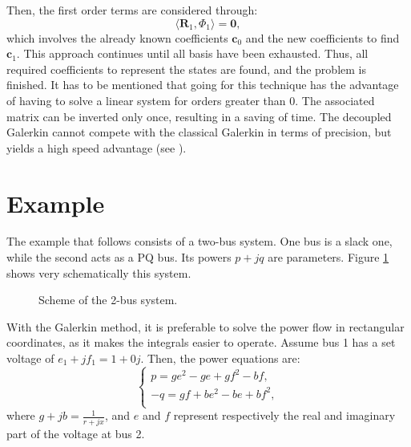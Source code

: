 Then, the first order terms are considered through:
\begin{equation}
   \langle \bm{R}_1, \Phi_1 \rangle = \bm{0},
\end{equation}
which involves the already known coefficients $\bm{c}_0$ and the new coefficients to find $\bm{c}_1$. This approach continues until all basis have been exhausted. Thus, all required coefficients to represent the states are found, and the problem is finished. It has to be mentioned that going for this technique has the advantage of having to solve a linear system for orders greater than 0. The associated matrix can be inverted only once, resulting in a saving of time. The decoupled Galerkin cannot compete with the classical Galerkin in terms of precision, but yields a high speed advantage (see \cite{zhou2016novel}).

\section{Example}
The example that follows consists of a two-bus system. One bus is a slack one, while the second acts as a PQ bus. Its powers $p+jq$ are parameters. Figure \ref{fig:2bus} shows very schematically this system.


\begin{figure}[!htb]\centering
  \caption{Scheme of the 2-bus system.}
  \label{fig:2bus}
\end{figure}
With the Galerkin method, it is preferable to solve the power flow in rectangular coordinates, as it makes the integrals easier to operate. Assume bus 1 has a set voltage of $e_1+jf_1=1+0j$. Then, the power equations are:
\begin{equation}
   \begin{cases}
   p = g e^2 - g e + g f^2 - b f, \\
   -q = g f + b e^2 - b e + b f^2, \\
\end{cases}
\label{eq:syst1}
\end{equation}
where $g+jb=\frac{1}{r+jx}$, and $e$ and $f$ represent respectively the real and imaginary part of the voltage at bus 2.


